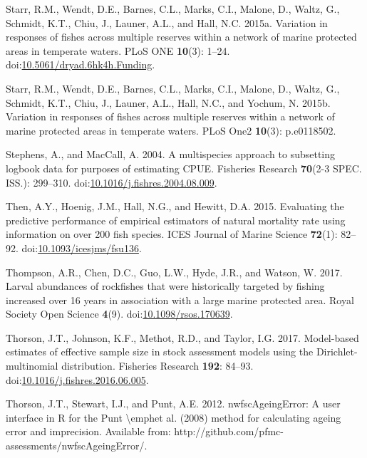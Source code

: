 \documentclass[11pt,
  english,
  letterpaper,
]{article}
\newlength{\cslhangindent}
\newenvironment{CSLReferences}[2] %
 {%
  \setlength{\parindent}{0pt}
  \ifodd #1 \everypar{\setlength{\hangindent}{\cslhangindent}}\ignorespaces\fi
  \ifnum #2 > 0
  \setlength{\parskip}{#2\baselineskip}
  \fi
 }%
 {}
\begin{document}
\begin{CSLReferences}{1}{0}
\leavevmode{}%
Starr, R.M., Wendt, D.E., Barnes, C.L., Marks, C.I., Malone, D., Waltz, G., Schmidt, K.T., Chiu, J., Launer, A.L., and Hall, N.C. 2015a. Variation in responses of fishes across multiple reserves within a network of marine protected areas in temperate waters. PLoS ONE \textbf{10}(3): 1--24. doi:\href{https://doi.org/10.5061/dryad.6hk4h.Funding}{10.5061/dryad.6hk4h.Funding}.

\leavevmode{}%
Starr, R.M., Wendt, D.E., Barnes, C.L., Marks, C.I., Malone, D., Waltz, G., Schmidt, K.T., Chiu, J., Launer, A.L., Hall, N.C., and Yochum, N. 2015b. Variation in responses of fishes across multiple reserves within a network of marine protected areas in temperate waters. PLoS One2 \textbf{10}(3): p.e0118502.

\leavevmode{}%
Stephens, A., and MacCall, A. 2004. A multispecies approach to subsetting logbook data for purposes of estimating {CPUE}. Fisheries Research \textbf{70}(2-3 SPEC. ISS.): 299--310. doi:\href{https://doi.org/10.1016/j.fishres.2004.08.009}{10.1016/j.fishres.2004.08.009}.

\leavevmode{}%
Then, A.Y., Hoenig, J.M., Hall, N.G., and Hewitt, D.A. 2015. Evaluating the predictive performance of empirical estimators of natural mortality rate using information on over 200 fish species. ICES Journal of Marine Science \textbf{72}(1): 82--92. doi:\href{https://doi.org/10.1093/icesjms/fsu136}{10.1093/icesjms/fsu136}.

\leavevmode{}%
Thompson, A.R., Chen, D.C., Guo, L.W., Hyde, J.R., and Watson, W. 2017. Larval abundances of rockfishes that were historically targeted by fishing increased over 16 years in association with a large marine protected area. Royal Society Open Science \textbf{4}(9). doi:\href{https://doi.org/10.1098/rsos.170639}{10.1098/rsos.170639}.

\leavevmode{}%
Thorson, J.T., Johnson, K.F., Methot, R.D., and Taylor, I.G. 2017. Model-based estimates of effective sample size in stock assessment models using the {Dirichlet}-multinomial distribution. Fisheries Research \textbf{192}: 84--93. doi:\href{https://doi.org/10.1016/j.fishres.2016.06.005}{10.1016/j.fishres.2016.06.005}.

\leavevmode{}%
Thorson, J.T., Stewart, I.J., and Punt, A.E. 2012. {nwfscAgeingError}: A user interface in {R} for the {Punt} {\textbackslash{}}emphet al. (2008) method for calculating ageing error and imprecision. Available from: http://github.com/pfmc-assessments/nwfscAgeingError/.


\end{CSLReferences}
\end{document}
